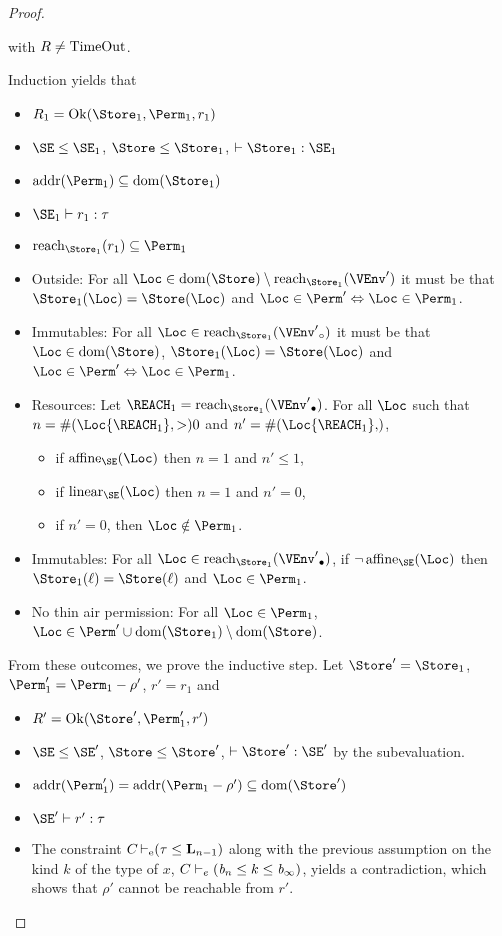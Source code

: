 \begin{proof}
\begin{itemize}
    with $R\ne \operatorname{TimeOut}$.
  \end{itemize}
  Induction yields that
  \begin{itemize}
  \item
    $R_1 = \Ok{\Store_1, \Perm_1, r_1}$
  \item $\SE \le \SE_1$, $\Store \le \Store_1$,
    $\vdash \Store_1 : \SE_1$
  \item $\Addresses{\Perm_1} \subseteq \Dom{\Store_1}$
  \item $\SE_1 \vdash r_1 : \tau$
  \item $\Reach{\Store_1}{r_1} \subseteq \Perm_1$
  \item Outside: For all $\Loc \in \Dom{\Store} \setminus
    \Reach{\Store_1}{\VEnv'}$ it must be that
    $\Store_1 (\Loc) = \Store (\Loc)$
    and $\Loc\in\Perm' \Leftrightarrow \Loc\in\Perm_1$.
  \item Immutables: For all $\Loc \in
    \Reach{\Store_1}{\ImmutableBorrows{\VEnv'}}$ it must be that
    $\Loc\in\Dom\Store$,
    $\Store_1 (\Loc) = \Store (\Loc)$
    and $\Loc\in\Perm' \Leftrightarrow \Loc\in\Perm_1$.
  \item Resources:
    Let $\REACH_1 =\Reach{\Store_1}{\Active{\VEnv'}}$.
    For all $\Loc$ such that $n= \MultiNumber\Loc{\REACH_1} >0$ and $n' =
    \MultiNumber\Loc{\REACH_1}$,
    \begin{itemize}
    \item if $\Affine{\SE}\Loc$ then $n=1$ and $n'\le 1$,
    \item if $\Linear{\SE}\Loc$ then $n=1$ and $n' = 0$,
    \item if $n'=0$, then $\Loc\notin\Perm_1$.
    \end{itemize}
  \item Immutables: For all $\Loc \in \Reach
    {\Store_1}{\Active{\VEnv'}}$, if $\neg\Writeable{\SE}\Loc$ then
    $\Store_1 (\ell) = \Store (\ell)$ and $\Loc\in \Perm_1$.
  \item No thin air permission: For all $\Loc\in \Perm_1$, $\Loc
    \in \Perm' \cup  \Dom{\Store_1} \setminus \Dom{\Store}$.
  \end{itemize}
  From these outcomes, we prove the inductive step.
  Let $\Store' = \Store_1$, $\Perm_1' = \Perm_1-\rho'$, $r' = r_1$ and
  \begin{itemize}
  \item $R' = \Ok{\Store', \Perm_1', r'}$
  \item  $\SE \le \SE'$, $\Store \le \Store'$,
    $\vdash \Store' : \SE'$  by the subevaluation.
  \item $\Addresses{\Perm_1'} = \Addresses{\Perm_1-\rho'} \subseteq \Dom{\Store'}$
  \item $\SE' \vdash r' : \tau$
  \item The constraint $C \operatorname{\vdash_e} (\tau \leq \mathbf{L}_{n-1})$
    along with the previous assumption on the kind $k$ of the type of $x$,
    $C \vdash_e {(\textit{b}_n\leq k\leq\textit{b}_\infty)}$, yields a
    contradiction, which shows that $\rho'$ cannot be reachable from $r'$.


\end{itemize}
\end{proof}
